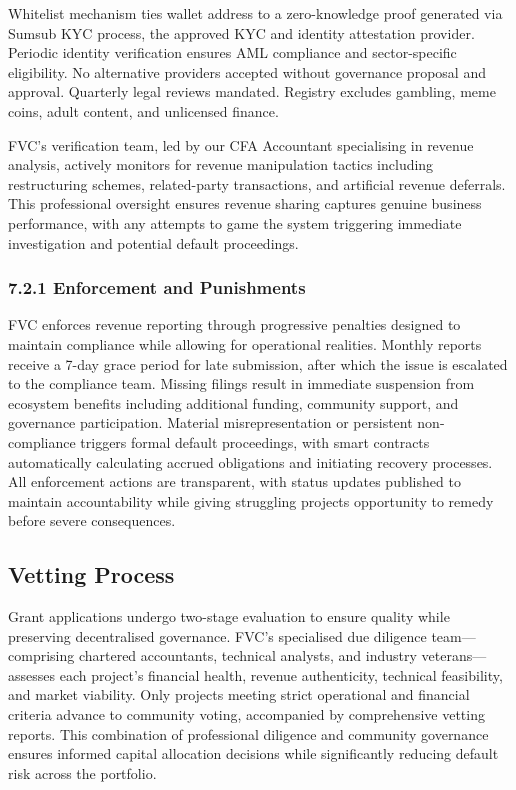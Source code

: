 \documentclass[
  paper=a4,
  ,captions=tableheading
]{scrartcl}
\begin{document}
Whitelist mechanism ties wallet address to a zero-knowledge proof
generated via Sumsub KYC process, the approved KYC and identity
attestation provider. Periodic identity verification ensures AML
compliance and sector-specific eligibility. No alternative providers
accepted without governance proposal and approval. Quarterly legal
reviews mandated. Registry excludes gambling, meme coins, adult content,
and unlicensed finance.

FVC's verification team, led by our CFA Accountant specialising
in revenue analysis, actively monitors for revenue manipulation tactics
including restructuring schemes, related-party transactions, and
artificial revenue deferrals. This professional oversight ensures
revenue sharing captures genuine business performance, with any attempts
to game the system triggering immediate investigation and potential
default proceedings.

\subsubsection{7.2.1 Enforcement and
Punishments}\label{enforcement-and-punishments}

FVC enforces revenue reporting through progressive penalties
designed to maintain compliance while allowing for operational
realities. Monthly reports receive a 7-day grace period for late
submission, after which the issue is escalated to the compliance team.
Missing filings result in immediate suspension from ecosystem
benefits including additional funding, community support, and governance
participation. Material misrepresentation or persistent non-compliance
triggers formal default proceedings, with smart contracts automatically
calculating accrued obligations and initiating recovery processes. All
enforcement actions are transparent, with status updates published to
maintain accountability while giving struggling projects opportunity to
remedy before severe consequences.

\subsection{Vetting Process}\label{vetting-process}

Grant applications undergo two-stage evaluation to ensure quality while
preserving decentralised governance. FVC's specialised due diligence
team---comprising chartered accountants, technical analysts, and
industry veterans---assesses each project's financial health, revenue
authenticity, technical feasibility, and market viability. Only projects
meeting strict operational and financial criteria advance to community
voting, accompanied by comprehensive vetting reports. This combination
of professional diligence and community governance ensures informed
capital allocation decisions while significantly reducing default risk
across the portfolio.
\end{document}
